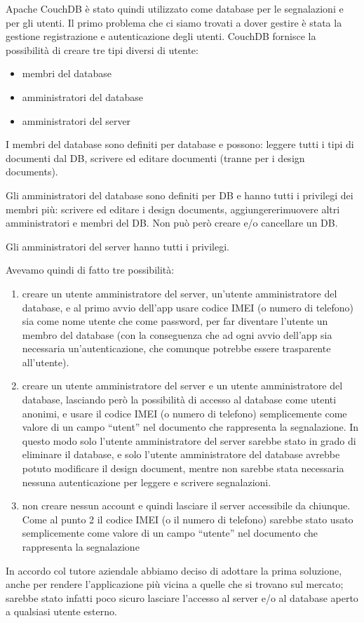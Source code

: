 		Apache CouchDB\texttrademark{} è stato quindi utilizzato come database 
		per le segnalazioni e per gli utenti.
		Il primo problema che ci siamo trovati a dover gestire è stata la gestione 
		registrazione e autenticazione degli utenti. CouchDB fornisce la 
		possibilità di creare tre tipi diversi di utente:
		\begin{itemize}
			\item membri del database
			\item amministratori del database
			\item amministratori del server
		\end{itemize}
		I membri del database sono definiti per database e possono: leggere tutti
		i tipi di documenti dal DB, scrivere ed editare documenti 
		(tranne per i design documents).

		Gli amministratori del database sono definiti per DB e hanno tutti i 
		privilegi dei membri più: scrivere ed editare i design documents, 
		aggiungere\/rimuovere altri amministratori e membri del DB. 
		Non può però creare e/o cancellare un DB.

		Gli amministratori del server hanno tutti i privilegi.
		
		Avevamo quindi di fatto tre possibilità:
		\begin{enumerate} 
			\item creare un utente amministratore del server, un'utente amministratore 
				del database, e al primo avvio dell'app usare codice IMEI (o numero di telefono) 
				sia come nome utente che come password, per far diventare l'utente un 
				membro del database (con la conseguenza che ad ogni avvio dell'app 
				sia necessaria un'autenticazione, che comunque potrebbe essere 
				trasparente all'utente).
			\item creare un utente amministratore del server e un utente amministratore 
				del database, lasciando però la possibilità di accesso al database 
				come utenti anonimi, e usare il codice IMEI (o numero di telefono) 
				semplicemente come valore di un campo ``utent'' nel documento che 
				rappresenta la segnalazione. In questo modo solo l'utente amministratore 
				del server sarebbe stato in grado di eliminare il database, e solo 
				l'utente amministratore del database avrebbe potuto modificare il 
				design document, mentre non sarebbe stata necessaria nessuna 
				autenticazione per leggere e scrivere segnalazioni.
			\item non creare nessun account e quindi lasciare il server accessibile 
				da chiunque. Come al punto 2 il codice IMEI (o il numero di telefono) 
				sarebbe stato usato semplicemente come valore di un campo ``utente''
				nel documento che rappresenta la segnalazione
		\end{enumerate}
		In accordo col tutore aziendale abbiamo deciso di adottare la prima soluzione, 
		anche per rendere l'applicazione più vicina a quelle che si trovano sul 
		mercato; sarebbe stato infatti poco sicuro lasciare l'accesso al server 
		e/o al database aperto a qualsiasi utente esterno.
		
